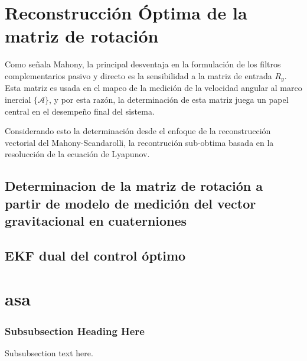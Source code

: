 \documentclass[conference]{IEEEtran}
\newcommand{\marco}[1]{\{\mathcal{#1}\}}
\begin{document}
\section{Reconstrucción Óptima de la matriz de rotación}
Como señala Mahony, la principal desventaja en la formulación de los filtros complementarios pasivo y directo es la sensibilidad a la matriz de entrada $R_y$. Esta matriz es usada en el mapeo de la medición de la velocidad angular al marco inercial $\marco{A}$, y por esta razón, la determinación de esta matriz juega un papel central en el desempeño final del sistema.\par
Considerando esto la determinación desde el enfoque de la reconstrucción vectorial del Mahony-Scandarolli, la recontrución sub-obtima basada en la resolucción de la ecuación de Lyapunov.
\subsection{Determinacion de la matriz de rotación a partir de modelo de medición del vector gravitacional en cuaterniones}
\subsection{EKF dual del control óptimo}
\section{asa}
\cite{IEEEhowto:kopka}


\subsubsection{Subsubsection Heading Here}
Subsubsection text here.


%
%
\end{document}
